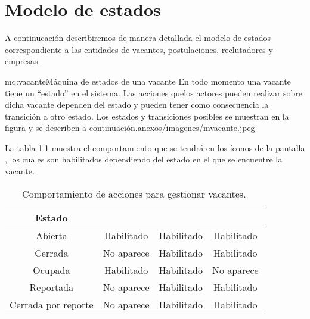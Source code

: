 \chapter{Modelo de estados}
A continucación describiremos de manera detallada el modelo de estados correspondiente a las entidades de vacantes, postulaciones, reclutadores
y empresas.
\begin{Maquina}{mq:vacante}{Máquina de estados de una vacante}{
	En todo momento una vacante tiene un ``estado'' en el sistema. Las acciones quelos actores pueden realizar sobre dicha vacante 
	dependen del estado y pueden tener como consecuencia la transición a otro estado.
	Los estados y transiciones posibles se muestran en la figura  y se describen a continuación.}{anexos/imagenes/mvacante.jpeg}

	La tabla \ref{figvacante} muestra el comportamiento que se tendrá en los íconos de la pantalla 
	, los cuales son habilitados dependiendo del estado en el que se encuentre  la vacante.


	\begin{table}[htbp]
		\begin{center}
			\begin{tabular}{|c|c|c|c|}
				\hline
				Estado &\IUbutton{Cerrar vacante}& \IUEliminar & \IUEditar \\
				\hline \hline
				Abierta  & Habilitado & Habilitado & Habilitado \\ \hline
				Cerrada & No aparece & Habilitado & Habilitado \\ \hline
				Ocupada & Habilitado & Habilitado & No aparece \\ \hline
				Reportada & No aparece & Habilitado & Habilitado \\ \hline
				Cerrada por reporte & No aparece & Habilitado & Habilitado\\ \hline
			\end{tabular}
			\caption{Comportamiento de acciones para gestionar vacantes.} 
			\label{figvacante}

		\end{center}
	\end{table}
\end{Maquina}

